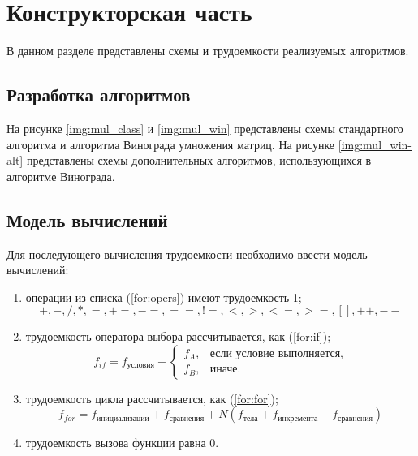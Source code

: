\chapter{Конструкторская часть}

В данном разделе представлены схемы и трудоемкости реализуемых алгоритмов.

\section{Разработка алгоритмов}

На рисунке \ref{img:mul_class} и \ref{img:mul_win} представлены схемы стандартного алгоритма и алгоритма Винограда умножения матриц.
На рисунке \ref{img:mul_win-alt} представлены схемы дополнительных алгоритмов, использующихся в алгоритме Винограда.

\clearpage
{}
\clearpage
\clearpage

\section{Модель вычислений}

Для последующего вычисления трудоемкости необходимо ввести модель вычислений:
\begin{enumerate}
    \item операции из списка (\ref{for:opers}) имеют трудоемкость 1;
        \begin{equation}
            \label{for:opers}
            +, -, /, *, =, +=, -=, ==, !=, <, >, <=, >=, [], ++, {-}-
        \end{equation}
    \item трудоемкость оператора выбора  рассчитывается, как (\ref{for:if});
	\begin{equation}
        \label{for:if}
        f_{if} = f_{\text{условия}} +
        \begin{cases}
        f_A, & \text{если условие выполняется,}\\
        f_B, & \text{иначе.}
        \end{cases}
	\end{equation}
\item трудоемкость цикла рассчитывается, как (\ref{for:for});
    \begin{equation}
        \label{for:for}
        f_{for} = f_{\text{инициализации}} + f_{\text{сравнения}} + N(f_{\text{тела}} + f_{\text{инкремента}} + f_{\text{сравнения}})
    \end{equation}
	\item трудоемкость вызова функции равна 0.
\end{enumerate}

